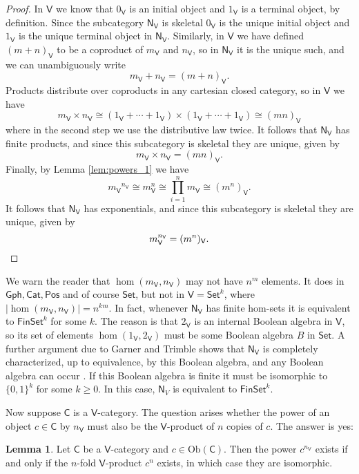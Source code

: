 \documentclass{amsart}
\theoremstyle{definition}
\newtheorem{lemma}[theorem]{Lemma}
\newcommand{\Gph}{\mathsf{Gph}}
\newcommand{\Set}{\mathsf{Set}}
\newcommand{\Cat}{\mathsf{Cat}}
\newcommand{\Pos}{\mathsf{Pos}}
\newcommand{\FinSet}{\mathsf{FinSet}}
\newcommand{\NN}{\mathsf{N}}
\newcommand{\V}{\mathsf{V}}
\newcommand{\C}{\mathsf{C}}
\newcommand{\Obj}{\mathrm{Ob}}
\begin{document}
\begin{proof}
 In $\V$ we know that $0_\V$ is an initial object and $1_\V$ is a terminal object, by
 definition.  Since the subcategory $\NN_\V$ is skeletal $0_\V$ is the unique 
 initial object and $1_\V$ is the unique terminal object in $\NN_\V$.   Similarly, in
 $\V$ we have defined $(m+n)_\V$ to be a coproduct of $m_\V$ and $n_\V$, so 
 in $\NN_\V$ it is the unique such, and we can unambiguously write 
 \[      m_\V + n_\V = (m + n)_\V .  \]
 Products distribute over coproducts in any cartesian closed category, so in $\V$ we have 
 \[   m_\V \times n_\V \cong (1_\V + \cdots + 1_\V) \times (1_\V + \cdots + 1_\V) 
 \cong (mn)_\V \]
 where in the second step we use the distributive law twice.
 It follows that $\NN_\V$ has finite products, and since this subcategory is skeletal
 they are unique, given by
 \[   m_\V \times n_\V = (mn)_\V.  \]
 Finally, by Lemma \ref{lem:powers_1} we have
 \[  {m_\V}^{n_\V} \cong m_\V^n \cong \prod_{i = 1}^n m_\V \cong
 (m^n)_\V .\]
 It follows that $\NN_\V$ has exponentials, and since this subcategory is skeletal they
 are unique, given by
 \[     m_\V^{n_\V} = (m^n)_\V .  \qedhere\]
\end{proof}

We warn the reader that $\hom(m_\V,n_\V)$ may not have $n^m$ elements.  It does
in $\Gph,\Cat,\Pos$ and of course $\Set$, but not in $\V = \Set^k$, where
$|\hom(m_\V, n_\V)| = n^{km}$.    In fact, whenever $\NN_\V$ has finite hom-sets
it is equivalent to $\FinSet^k$ for some $k$.   The reason is that $2_\V$ is 
an internal Boolean algebra in $\V$, so its set of elements $\hom(1_\V,2_\V)$ 
must be some Boolean algebra $B$ in $\Set$.   A further argument due to Garner and Trimble shows that $\NN_\V$ is completely characterized, up to equivalence, by this Boolean algebra, and any Boolean algebra can occur \cite{nCafe}.   If this Boolean algebra is finite it must be isomorphic to $\{0,1\}^k$ for some $k \ge 0$.  In this case, $\NN_V$ is equivalent to $\FinSet^k$.

Now suppose $\C$ is a $\V$-category.   The question arises whether the
power of an object $c \in \C$ by $n_\V$ must also be the $\V$-product of $n$ copies
of $c$.   The answer is yes:

\begin{lemma}
\label{lem:powers_2}
Let $\C$ be a $\V$-category and $c \in \Obj(\C)$.  Then the power $c^{n_\V}$ exists
if and only if the $n$-fold $\V$-product $c^n$ exists, in which case they are isomorphic.
\end{lemma}
\end{document}
